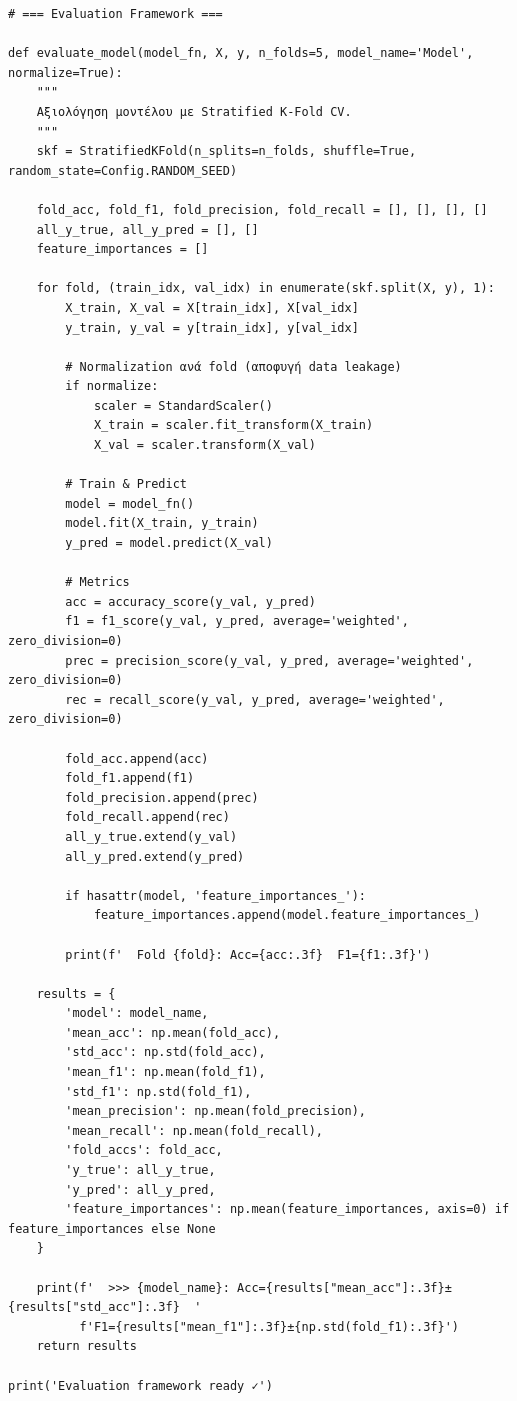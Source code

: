 \begin{lstlisting}
# === Evaluation Framework ===
 
def evaluate_model(model_fn, X, y, n_folds=5, model_name='Model', normalize=True):
    """
    Αξιολόγηση μοντέλου με Stratified K-Fold CV.
    """
    skf = StratifiedKFold(n_splits=n_folds, shuffle=True, random_state=Config.RANDOM_SEED)
 
    fold_acc, fold_f1, fold_precision, fold_recall = [], [], [], []
    all_y_true, all_y_pred = [], []
    feature_importances = []
 
    for fold, (train_idx, val_idx) in enumerate(skf.split(X, y), 1):
        X_train, X_val = X[train_idx], X[val_idx]
        y_train, y_val = y[train_idx], y[val_idx]
 
        # Normalization ανά fold (αποφυγή data leakage)
        if normalize:
            scaler = StandardScaler()
            X_train = scaler.fit_transform(X_train)
            X_val = scaler.transform(X_val)
 
        # Train & Predict
        model = model_fn()
        model.fit(X_train, y_train)
        y_pred = model.predict(X_val)
 
        # Metrics
        acc = accuracy_score(y_val, y_pred)
        f1 = f1_score(y_val, y_pred, average='weighted', zero_division=0)
        prec = precision_score(y_val, y_pred, average='weighted', zero_division=0)
        rec = recall_score(y_val, y_pred, average='weighted', zero_division=0)
 
        fold_acc.append(acc)
        fold_f1.append(f1)
        fold_precision.append(prec)
        fold_recall.append(rec)
        all_y_true.extend(y_val)
        all_y_pred.extend(y_pred)
 
        if hasattr(model, 'feature_importances_'):
            feature_importances.append(model.feature_importances_)
 
        print(f'  Fold {fold}: Acc={acc:.3f}  F1={f1:.3f}')
 
    results = {
        'model': model_name,
        'mean_acc': np.mean(fold_acc),
        'std_acc': np.std(fold_acc),
        'mean_f1': np.mean(fold_f1),
        'std_f1': np.std(fold_f1),
        'mean_precision': np.mean(fold_precision),
        'mean_recall': np.mean(fold_recall),
        'fold_accs': fold_acc,
        'y_true': all_y_true,
        'y_pred': all_y_pred,
        'feature_importances': np.mean(feature_importances, axis=0) if feature_importances else None
    }
 
    print(f'  >>> {model_name}: Acc={results["mean_acc"]:.3f}±{results["std_acc"]:.3f}  '
          f'F1={results["mean_f1"]:.3f}±{np.std(fold_f1):.3f}')
    return results
 
print('Evaluation framework ready ✓')
\end{lstlisting}
 
